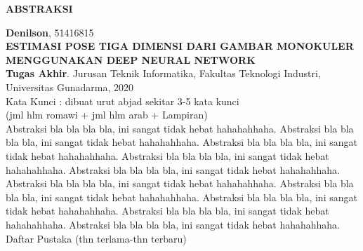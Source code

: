 \newpage %
\begin{center}
\begin{large}\textbf{ABSTRAKSI}\end{large}
\end{center}

\vspace{5mm} 

\noindent \textbf{Denilson}, 51416815 \\
\textbf{ESTIMASI POSE TIGA DIMENSI DARI GAMBAR MONOKULER MENGGUNAKAN DEEP NEURAL NETWORK}\\
\textbf{Tugas Akhir}. Jurusan Teknik Informatika, Fakultas Teknologi Industri, \\
Universitas Gunadarma, 2020\\
Kata Kunci : dibuat urut abjad sekitar 3-5 kata kunci\\
\noindent (jml hlm romawi + jml hlm arab + Lampiran)\\

Abstraksi bla bla bla bla, ini sangat tidak hebat hahahahhaha.
Abstraksi bla bla bla bla, ini sangat tidak hebat hahahahhaha.
Abstraksi bla bla bla bla, ini sangat tidak hebat hahahahhaha.
Abstraksi bla bla bla bla, ini sangat tidak hebat hahahahhaha.
Abstraksi bla bla bla bla, ini sangat tidak hebat hahahahhaha.
Abstraksi bla bla bla bla, ini sangat tidak hebat hahahahhaha.
Abstraksi bla bla bla bla, ini sangat tidak hebat hahahahhaha.
Abstraksi bla bla bla bla, ini sangat tidak hebat hahahahhaha.
Abstraksi bla bla bla bla, ini sangat tidak hebat hahahahhaha.
Abstraksi bla bla bla bla, ini sangat tidak hebat hahahahhaha.\\

\noindent Daftar Pustaka (thn terlama-thn terbaru)
